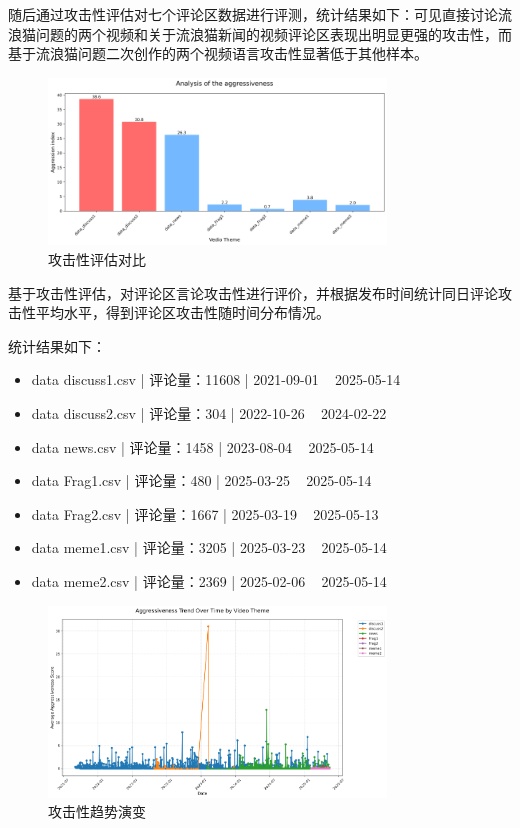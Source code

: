 \documentclass[12pt,a4paper]{ctexart}
\begin{document}
随后通过攻击性评估对七个评论区数据进行评测，统计结果如下：可见直接讨论流浪猫问题的两个视频和关于流浪猫新闻的视频评论区表现出明显更强的攻击性，而基于流浪猫问题二次创作的两个视频语言攻击性显著低于其他样本。

\begin{figure}[htbp]
    \centering
    \includegraphics[width=0.8\textwidth]{img/aggressive_analysis.png}
    \caption{攻击性评估对比}
\end{figure}
\newpage

基于攻击性评估，对评论区言论攻击性进行评价，并根据发布时间统计同日评论攻击性平均水平，得到评论区攻击性随时间分布情况。

统计结果如下：

\begin{itemize}
    \item data discuss1.csv | 评论量：11608 | 2021-09-01 ~ 2025-05-14
    \item data discuss2.csv | 评论量：304 | 2022-10-26 ~ 2024-02-22
    \item data news.csv | 评论量：1458 | 2023-08-04 ~ 2025-05-14
    \item data Frag1.csv | 评论量：480 | 2025-03-25 ~ 2025-05-14
    \item data Frag2.csv | 评论量：1667 | 2025-03-19 ~ 2025-05-13
    \item data meme1.csv | 评论量：3205 | 2025-03-23 ~ 2025-05-14
    \item data meme2.csv | 评论量：2369 | 2025-02-06 ~ 2025-05-14
\end{itemize}

\begin{figure}[htbp]
    \centering
    \includegraphics[width=0.8\textwidth]{img/aggressive_trend.png}
    \caption{攻击性趋势演变}
\end{figure}
\newpage
\end{document}
